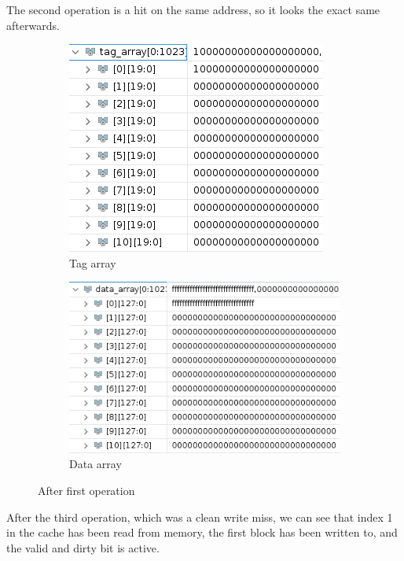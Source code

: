 \documentclass{article}
\begin{document}
The second operation is a hit on the same address, so it looks the exact same afterwards.
\begin{figure}[H]
\centering
\begin{subfigure}{.5\textwidth}
  \centering
  \includegraphics[width=.8\linewidth]{img/tag1.png}
  \caption{Tag array}
\end{subfigure}%
\begin{subfigure}{.5\textwidth}
  \centering
  \includegraphics[width=.9\linewidth]{img/data1.png}
  \caption{Data array}
\end{subfigure}
\caption{After first operation}
\end{figure}





After the third operation, which was a clean write miss, we can see that index 1 in the cache has been read from memory, the first block has been written to, and the valid and dirty bit is active. 
\end{document}
